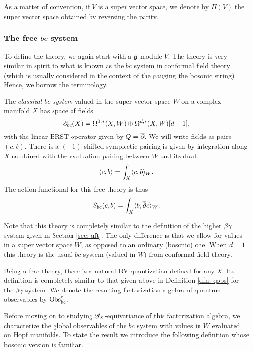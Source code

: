 \begin{rmk}
As a matter of convention, if $V$ is a super vector space, we denote by $\Pi(V)$ the super vector space obtained by reversing the parity. 
\end{rmk}

\subsubsection{The free $bc$ system}

To define the theory, we again start with a $\mathfrak g$-module $V$.
The theory is very similar in spirit to what is known as the $bc$ system in conformal field theory (which is usually considered in the context of the gauging the bosonic string). 
Hence, we borrow the terminology. 

\begin{dfn}
The {\em classical $bc$ system} valued in the super vector space $W$ on a complex manifold $X$ has space of fields
\[
\mathscr E_{bc} (X) = \Omega^{0,*}(X , W) \oplus \Omega^{d,*}(X , W)[d-1],
\]
with the linear BRST operator given by $Q = \overline{\partial}$.
We will write fields as pairs $(c,b)$. 
There is a $(-1)$-shifted symplectic pairing is given by integration along $X$ combined with the evaluation pairing between $W$ and its dual: 
\[
\langle c,b\rangle = \int_X \langle c, b\rangle_{W}.
\] 
The action functional for this free theory is thus
\[
S_{bc} (c,b) = \int_X \langle b , \overline{\partial} c\rangle_{W} .
\]
\end{dfn}

\begin{rmk}
Note that this theory is completely similar to the definition of the higher $\beta\gamma$ system given in Section \ref{sec: qft}. 
The only difference is that we allow for values in a super vector space $W$, as opposed to an ordinary (bosonic) one. 
When $d=1$ this theory is the usual $bc$ system (valued in $W$) from conformal field theory.
\end{rmk}

Being a free theory, there is a natural BV quantization defined for any $X$.
Its definition is completely similar to that given above in Definition \ref{dfn: qobs} for the $\beta\gamma$ system. 
We denote the resulting factorization algebra of quantum observables by ${\rm Obs}^{\rm q}_{bc}$. 

Before moving on to studying $\mathscr G_X$-equivariance of this factorization algebra, we characterize the global observables of the $bc$ system with values in $W$ evaluated on Hopf manifolds. 
To state the result we introduce the following definition whose bosonic version is familiar. 

